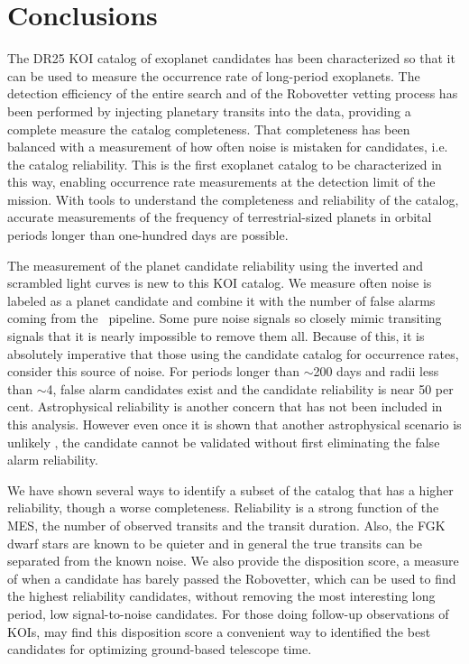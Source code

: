 

\section{Conclusions}

The DR25 KOI catalog of exoplanet candidates has been characterized so that it can be used to measure the occurrence rate of long-period exoplanets. The detection efficiency of the entire search \citep{Burke2017b,Christiansen2017} and of the Robovetter vetting process has been performed by injecting planetary transits into the data, providing a complete measure the catalog completeness. That completeness has been balanced with a measurement of how often noise is mistaken for candidates, i.e. the catalog reliability. This is the first exoplanet catalog to be characterized in this way, enabling occurrence rate measurements at the detection limit of the mission.  With tools to understand the completeness and reliability of the catalog, accurate measurements of the frequency of terrestrial-sized planets in orbital periods longer than one-hundred days are possible.

The measurement of the planet candidate reliability using the inverted and scrambled light curves is new to this KOI catalog. We measure often noise is labeled as a planet candidate and combine it with the number of false alarms coming from the \Kepler\ pipeline. Some pure noise signals so closely mimic transiting signals that it is nearly impossible to remove them all. Because of this, it is absolutely imperative that those using the candidate catalog for occurrence rates, consider this source of noise. For periods longer than $\sim$200 days and radii less than $\sim$4\Rearth, false alarm candidates exist and the candidate reliability is near 50 per cent.  Astrophysical reliability is another concern that has not been included in this analysis.  However even once it is shown that another astrophysical scenario is unlikely \citep[as was done for the DR24 KOIs in ][]{Morton2017}, the candidate cannot be validated without first eliminating the false alarm reliability. 

We have shown several ways to identify a subset of the catalog that has a higher reliability, though a worse completeness. Reliability is a strong function of the MES, the number of observed transits and the transit duration. Also, the FGK dwarf stars are known to be quieter and in general the true transits can be separated from the known noise. We also provide the disposition score, a measure of when a candidate has barely passed the Robovetter, which can be used to find the highest reliability candidates, without removing the most interesting long period, low signal-to-noise candidates. For those doing follow-up observations of KOIs, may find this disposition score a convenient way to identified the best candidates for optimizing ground-based telescope time.

